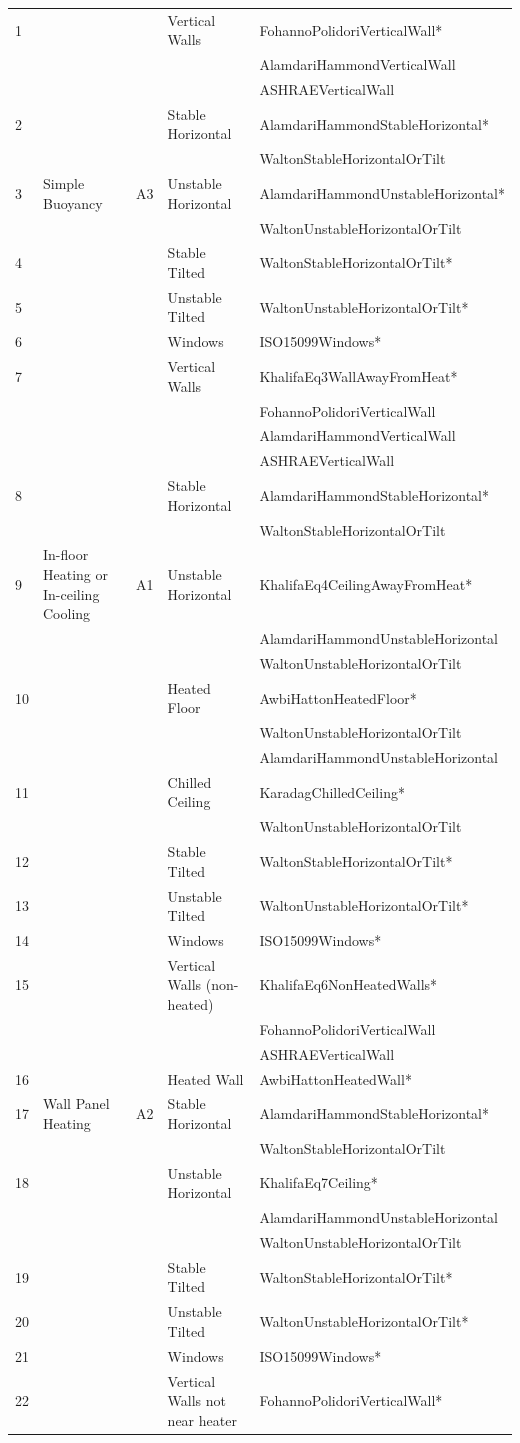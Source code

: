 {\begin{longtable}[c]{p{0.25in}p{1.25in}p{0.25in}p{1.5in}p{2.5in}}
1  & & & Vertical Walls & FohannoPolidoriVerticalWall* \tabularnewline
   & & & & AlamdariHammondVerticalWall \tabularnewline
   & & & & ASHRAEVerticalWall \tabularnewline
2  & & & Stable Horizontal & AlamdariHammondStableHorizontal* \tabularnewline
   & & & & WaltonStableHorizontalOrTilt \tabularnewline
3  & Simple Buoyancy & A3 & Unstable Horizontal & AlamdariHammondUnstableHorizontal* \tabularnewline
   & & & & WaltonUnstableHorizontalOrTilt \tabularnewline
4  & & & Stable Tilted & WaltonStableHorizontalOrTilt* \tabularnewline
5  & & & Unstable Tilted & WaltonUnstableHorizontalOrTilt* \tabularnewline
6  & & & Windows & ISO15099Windows* \tabularnewline
\midrule
7  & & & Vertical Walls & KhalifaEq3WallAwayFromHeat* \tabularnewline
   & & & & FohannoPolidoriVerticalWall \tabularnewline
   & & & & AlamdariHammondVerticalWall \tabularnewline
   & & & & ASHRAEVerticalWall \tabularnewline
8  & & & Stable Horizontal & AlamdariHammondStableHorizontal* \tabularnewline
   & & & & WaltonStableHorizontalOrTilt \tabularnewline
9  & In-floor Heating or In-ceiling Cooling & A1 & Unstable Horizontal & KhalifaEq4CeilingAwayFromHeat* \tabularnewline
   & & & & AlamdariHammondUnstableHorizontal \tabularnewline
   & & & & WaltonUnstableHorizontalOrTilt \tabularnewline
10 & & & Heated Floor & AwbiHattonHeatedFloor* \tabularnewline
 & & & & WaltonUnstableHorizontalOrTilt \tabularnewline
 & & & & AlamdariHammondUnstableHorizontal \tabularnewline
11 & & & Chilled Ceiling & KaradagChilledCeiling* \tabularnewline
 & & & & WaltonUnstableHorizontalOrTilt \tabularnewline
12 & & & Stable Tilted & WaltonStableHorizontalOrTilt* \tabularnewline
13 & & & Unstable Tilted & WaltonUnstableHorizontalOrTilt* \tabularnewline
14 & & & Windows & ISO15099Windows* \tabularnewline
\midrule
15 & & & Vertical Walls (non-heated) & KhalifaEq6NonHeatedWalls* \tabularnewline
 & & & & FohannoPolidoriVerticalWall \tabularnewline
 & & & & ASHRAEVerticalWall \tabularnewline
16 & & & Heated Wall & AwbiHattonHeatedWall* \tabularnewline
17 & Wall Panel Heating & A2 & Stable Horizontal & AlamdariHammondStableHorizontal* \tabularnewline
 & & & & WaltonStableHorizontalOrTilt \tabularnewline
18 & & & Unstable Horizontal & KhalifaEq7Ceiling* \tabularnewline
 & & & & AlamdariHammondUnstableHorizontal \tabularnewline
 & & & & WaltonUnstableHorizontalOrTilt \tabularnewline
19 & & & Stable Tilted & WaltonStableHorizontalOrTilt* \tabularnewline
20 & & & Unstable Tilted & WaltonUnstableHorizontalOrTilt* \tabularnewline
21 & & & Windows & ISO15099Windows* \tabularnewline
\midrule
22 & & & Vertical Walls not near heater & FohannoPolidoriVerticalWall* \tabularnewline

\end{longtable}}
